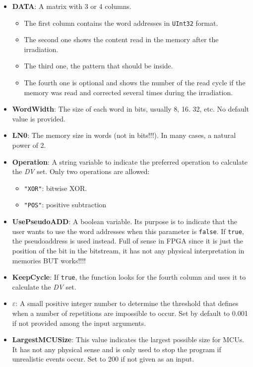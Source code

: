 \begin{itemize}
\begin{itemize}
		\item   \textbf{DATA}: A matrix with 3 or 4 columns. 
			 \begin{itemize}
			 	\item The first column contains the word addresses in \texttt{UInt32} format.
			 	\item The second one shows the content read in the memory after the irradiation.
			 	\item The third one, the pattern that should be inside.
			 	\item  The fourth one is optional and shows the number of the read cycle if the   memory was read and corrected several times during the irradiation.
			 \end{itemize}
		\item   \textbf{WordWidth}: The size of each word in bits, usually 8, 16. 32, etc. No default value is provided.
		\item   \textbf{LN0}: The memory size in words (not in bits!!!). In many cases, a natural power of 2.
		\item   \textbf{Operation}: A string variable to indicate the preferred operation to calculate
	    the \textit{DV} set. Only two operations are allowed: 
	    \begin{itemize}
	    	\item \texttt{"XOR"}: bitwise XOR.
	    	\item\texttt{"POS"}: positive subtraction
	    \end{itemize}
		\item  \textbf{UsePseudoADD}: A boolean variable. Its purpose is to indicate that the user wants to use the word addresses when this parameter is \texttt{false}. If \texttt{true}, the pseudoaddress  is used instead. Full of sense in FPGA since it is just the position  of the bit in the bitstream, it has not any physical interpretation in memories BUT works!!!!
		\item   \textbf{KeepCycle}: If \texttt{true}, the function looks for the fourth column and uses it to calculate the \textit{DV} set.
		\item   \textbf{\(\varepsilon\)}: A small positive integer number to determine the threshold that defines when a number of repetitions are impossible to occur. Set by default to 0.001 if not provided among the input arguments.
		\item  \textbf{LargestMCUSize}: This value indicates the largest possible size for MCUs. It has not any physical sense  and is only used to stop the program if unrealistic events occur. Set to 200 if not given as an input.


\end{itemize}
\end{itemize}
